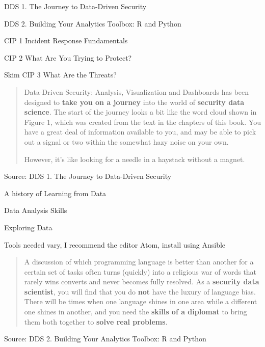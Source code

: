 \documentclass[Screen16to9,17pt]{foils}
\begin{document}

\begin{list1}
\item DDS 1. The Journey to Data-Driven Security
\item DDS 2. Building Your Analytics Toolbox: R and Python
\item CIP 1 Incident Response Fundamentals
\item CIP 2 What Are You Trying to Protect?
\vskip 1cm
\item Skim CIP 3 What Are the Threats?

\end{list1}





\begin{quote}
Data-Driven Security: Analysis, Visualization and Dashboards has been designed to {\bf take you on a journey}
into the world of {\bf security data science}. The start of the journey looks a bit like the word cloud shown in Figure 1, which was created from the text in the chapters of this book. You have a great deal of information available to you, and may be able to pick out a signal or two within the somewhat hazy noise on your own.

However, it’s like looking for a needle in a haystack without a magnet.
\end{quote}
Source: DDS 1. The Journey to Data-Driven Security

\begin{list2}
\item A history of Learning from Data
\item Data Analysis Skills
\item Exploring Data
\item Tools needed vary, I recommend the editor Atom, install using Ansible \smiley
\end{list2}



\begin{quote}
A discussion of which programming language is better than another for a certain set of tasks often turns (quickly) into a religious war of words that rarely wins converts and never becomes fully resolved. As a {\bf security data scientist}, you will find that you do {\bf not} have the luxury of language bias. There will be times when one language shines in one area while a different one shines in another, and you need the {\bf skills of a diplomat} to bring them both together to {\bf solve real problems}.
\end{quote}
Source: DDS 2. Building Your Analytics Toolbox: R and Python
\end{document}
